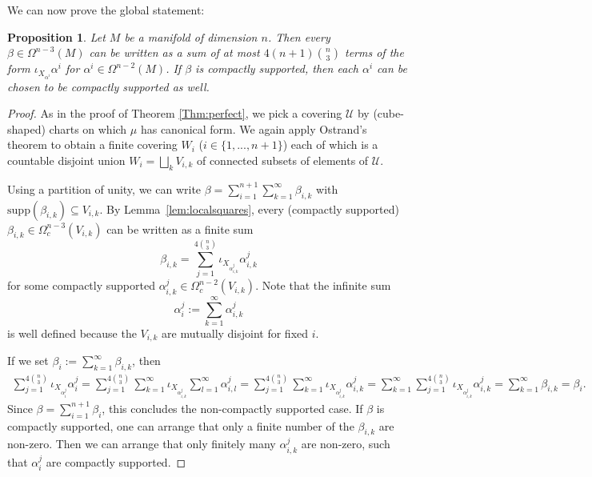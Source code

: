 \documentclass{article}
\newcommand{\supp}{\mathrm{supp}}
\newtheorem{Proposition}[Theorem]{Proposition}
\theoremstyle{definition}
\begin{document}
We can now prove the global statement:

\begin{Proposition}
    Let $M$ be a manifold of dimension $n$. Then every 
$\beta \in \Omega^{n-3}(M)$ can be written as a sum of at most $4(n+1)\binom{n}{3}$ terms of the form $\iota_{X_{\alpha^i}}\alpha^i$ for $\alpha^i \in \Omega^{n-2}(M)$. If $\beta$ is compactly supported, then each $\alpha^{i}$ can be chosen to be compactly supported as well.
\end{Proposition}
\begin{proof}
As in the proof of Theorem \ref{Thm:perfect}, we pick a covering $\mathcal U$ by (cube-shaped) charts on which $\mu$ has canonical form. We again apply Ostrand's theorem \cite[Theorem 1]{ostrandCoveringDimensionGeneral1971} to obtain a finite covering $W_i$ ($i\in \{1,...,n+1\}$) each of which is a countable disjoint union $W_i=\bigsqcup_k V_{i,k}$ of connected subsets of elements of $\mathcal U$.

Using a partition of unity, we can write 
$\beta = \sum_{i=1}^{n+1}\sum_{k=1}^{\infty}\beta_{i,k}$ with $\supp(\beta_{i,k})\subseteq V_{i,k}$. By Lemma~\ref{lem:localsquares}, every 
(compactly supported) $\beta_{i,k} \in \Omega^{n-3}_{c}(V_{i,k})$ can be written as a finite sum 
\[\beta_{i,k} = \sum_{j=1}^{4{\binom{n}{3}}} \iota_{X_{\alpha_{i,k}^{j}}} \alpha_{i,k}^{j}\]
for some compactly supported $\alpha_{i,k}^{j} \in \Omega^{n-2}_{c}(V_{i,k})$.
Note that the infinite sum
\[\alpha_{i}^{j} := \sum_{k=1}^{\infty} \alpha_{i,k}^{j}\]
is well defined because the $V_{i,k}$
are mutually disjoint for fixed $i$.

If we set $\beta_i := \sum_{k=1}^{\infty} \beta_{i,k}$, then 
\begin{eqnarray*}
\sum_{j=1}^{4{\binom{n}{3}}} \iota_{X_{\alpha^{j}_{i}}}\alpha^{j}_{i}
=
\sum_{j=1}^{4{\binom{n}{3}}} 
    \sum_{k=1}^{\infty} \iota_{X_{\alpha^{j}_{i,k}}}
    \sum_{l=1}^{\infty} \alpha^{j}_{i,l}
=
\sum_{j=1}^{4{\binom{n}{3}}} 
    \sum_{k=1}^{\infty} \iota_{X_{\alpha^{j}_{i,k}}} \alpha^{j}_{i,k}
    =
    \sum_{k=1}^{\infty} 
    \sum_{j=1}^{4{\binom{n}{3}}} \iota_{X_{\alpha^{j}_{i,k}}} \alpha^{j}_{i,k}
    =
    \sum_{k=1}^{\infty}\beta_{i,k} = \beta_i.
\end{eqnarray*}
Since $\beta = \sum_{i=1}^{n+1} \beta_{i}$, this concludes the non-compactly supported case. If $\beta$ is compactly supported, one can arrange that only a finite number of the $\beta_{i,k}$ are non-zero. Then we can arrange that only finitely many $\alpha_{i,k}^j$ are non-zero, such that $\alpha_i^j$ are compactly supported. 
\end{proof}
\end{document}
